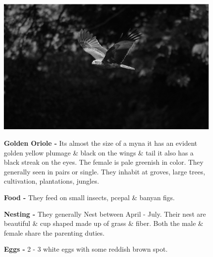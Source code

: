 \begin{figure}[H]
\begin{center}
\includegraphics{figure/Land_birds/01_pariah_kite/pariah-kite.eps}
\end{center}
\medskip
\noindent
{\bf Golden Oriole -} Its almost the size of a myna it has an evident golden yellow plumage \& black on the wings \& tail it also has a black streak on the eyes. The female is pale greenish in color. They generally seen in pairs or single. They inhabit at groves, large trees, cultivation, plantations, jungles.

\medskip
{\bf Food -} They feed on small insects, pcepal \& banyan figs.

{\bf Nesting -} They generally Nest between April - July. Their nest are beautiful \& cup shaped made up of grass \& fiber. Both the male \& female share the parenting duties.

{\bf Eggs -} 2 - 3 white eggs with some reddish brown spot.
\end{figure}

\vfill\eject

~\phantom{a}
\vfill

